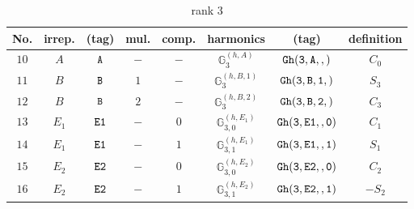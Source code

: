 \documentclass[fleqn,8pt]{jsarticle}
\begin{document}
\begin{table}[ht!]
\begin{center}
\caption{rank 3}
\renewcommand{\arraystretch}{1.3}
\begin{tabular}{cccccccc} \hline \hline
No. & irrep. & (tag) & mul. & comp. & harmonics & (tag) & definition \\ \hline
$ 10 $ & $ A $ & $ {\tt A} $ & $ - $ & $ - $ & $ \mathbb{G}_{3}^{(h,A)} $ & $ {\tt Gh(3,A,,)} $ & $ C_{0} $ \\
$ 11 $ & $ B $ & $ {\tt B} $ & $ 1 $ & $ - $ & $ \mathbb{G}_{3}^{(h,B,1)} $ & $ {\tt Gh(3,B,1,)} $ & $ S_{3} $ \\
$ 12 $ & $ B $ & $ {\tt B} $ & $ 2 $ & $ - $ & $ \mathbb{G}_{3}^{(h,B,2)} $ & $ {\tt Gh(3,B,2,)} $ & $ C_{3} $ \\
$ 13 $ & $ E_{1} $ & $ {\tt E1} $ & $ - $ & $ 0 $ & $ \mathbb{G}_{3,0}^{(h,E_{1})} $ & $ {\tt Gh(3,E1,,0)} $ & $ C_{1} $ \\
$ 14 $ & $ E_{1} $ & $ {\tt E1} $ & $ - $ & $ 1 $ & $ \mathbb{G}_{3,1}^{(h,E_{1})} $ & $ {\tt Gh(3,E1,,1)} $ & $ S_{1} $ \\
$ 15 $ & $ E_{2} $ & $ {\tt E2} $ & $ - $ & $ 0 $ & $ \mathbb{G}_{3,0}^{(h,E_{2})} $ & $ {\tt Gh(3,E2,,0)} $ & $ C_{2} $ \\
$ 16 $ & $ E_{2} $ & $ {\tt E2} $ & $ - $ & $ 1 $ & $ \mathbb{G}_{3,1}^{(h,E_{2})} $ & $ {\tt Gh(3,E2,,1)} $ & $ - S_{2} $ \\
 \hline \hline
\end{tabular}
\end{center}
\end{table}
\end{document}
